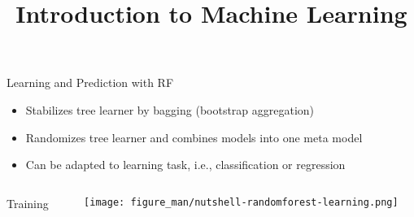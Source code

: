 \documentclass[11pt,compress,t,notes=noshow, xcolor=table]{beamer}
\title{Introduction to Machine Learning}
\begin{document}



\begin{vbframe}{Learning and Prediction with RF}
\begin{itemize}
\item \small Stabilizes tree learner by bagging (bootstrap aggregation)
\item \small Randomizes tree learner and combines models into one meta model
\item \small Can be adapted to learning task, i.e., classification or regression
\end{itemize}

\begin{columns}  
\begin{column}{0.1\textwidth} 
\begin{center}
\vspace{2.2cm}
Training
\end{center}
\end{column}
\begin{column}{0.9\textwidth} 
\begin{center}
  \texttt{[image: figure\_man/nutshell-randomforest-learning.png]}
\end{center}
\end{column}
\end{columns}
\end{vbframe} 
\end{document}
